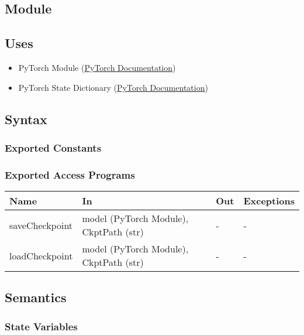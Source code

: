 \documentclass[12pt, titlepage]{article}
\begin{document}
\subsection{Module}



\subsection{Uses}
\begin{itemize}
  \item PyTorch Module (\href{https://pytorch.org/docs/stable/generated/torch.nn.Module.html}{PyTorch Documentation})
  \item PyTorch State Dictionary (\href{https://pytorch.org/tutorials/beginner/saving_loading_models.html}{PyTorch Documentation})
\end{itemize}

\subsection{Syntax}



\subsubsection{Exported Constants}



\subsubsection{Exported Access Programs}

\begin{center}
\begin{tabular}{p{3cm}|p{5cm}|p{2cm}|p{2cm}}
\hline
\textbf{Name} & \textbf{In} & \textbf{Out} & \textbf{Exceptions} \\
\hline
saveCheckpoint & model (PyTorch Module), CkptPath (str) & - & - \\
\hline
loadCheckpoint & model (PyTorch Module), CkptPath (str) & - & - \\
\hline
\end{tabular}
\end{center}

\subsection{Semantics}

\subsubsection{State Variables}
\end{document}
